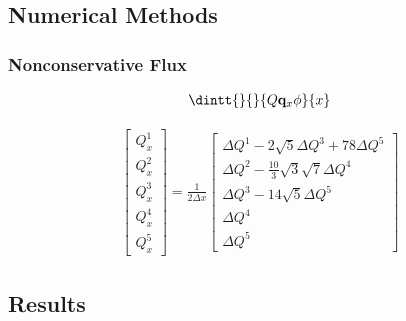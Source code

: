 \documentclass[10pt]{beamer}
\begin{document}
    \subsection{Numerical Methods}
      \begin{frame}
        \frametitle{Nonconservative Flux}

        \begin{gather*}
          \dintt{}{}{Q \v{q}_x \phi}{x}
        \end{gather*}

        \begin{gather*}
          \begin{bmatrix}
            Q_x^1 \\
            Q_x^2 \\
            Q_x^3 \\
            Q_x^4 \\
            Q_x^5
          \end{bmatrix}
          = \frac{1}{2\Delta x}
          \begin{bmatrix}
            \Delta Q^1 - 2\sqrt{5} \Delta Q^3 + 78 \Delta Q^5 \\
            \Delta Q^2 - \frac{10}{3} \sqrt{3} \sqrt{7} \Delta Q^4 \\
            \Delta Q^3 - 14 \sqrt{5} \Delta Q^5 \\
            \Delta Q^4 \\
            \Delta Q^5
          \end{bmatrix}
        \end{gather*}

      \end{frame}

    \subsection{Results}
\end{document}
